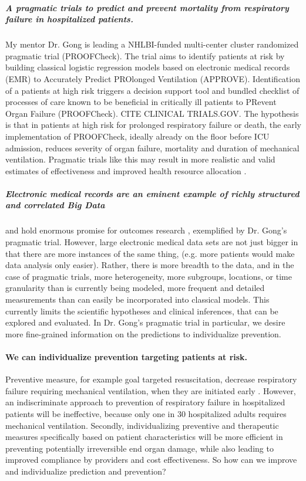 \documentclass[11pt,notitlepage]{article}
\begin{document}
\subparagraph{A pragmatic trials to predict and prevent mortality from respiratory failure in hospitalized patients.} My mentor Dr. Gong is leading a NHLBI-funded multi-center cluster randomized pragmatic trial (PROOFCheck). The trial aims to identify patients at risk by building classical logistic regression models based on electronic medical records (EMR) to Accurately Predict PROlonged Ventilation (APPROVE). Identification of a patients at high risk triggers a decision support tool and bundled checklist of processes of care known to be beneficial in critically ill patients to PRevent Organ Failure (PROOFCheck). CITE CLINICAL TRIALS.GOV. The hypothesis is that in patients at high risk for prolonged respiratory failure or death, the early implementation of PROOFCheck, ideally already on the floor before ICU admission, reduces severity of organ failure, mortality and duration of mechanical ventilation. Pragmatic trials like this may result in more realistic and valid estimates of effectiveness and improved health resource allocation \cite{Selby_22824225,Tosh_21842618}.

\subparagraph{Electronic medical records are an eminent example of richly structured and correlated Big Data} 
and hold enormous promise for outcomes research \cite{Dean_19279318,Amarasingham20940649},  exemplified by Dr. Gong's pragmatic trial. However, large electronic medical data sets are not just bigger in that there are more instances of the same thing, (e.g. more patients would make data analysis only easier).  Rather, there is more breadth to the data, and in the case of pragmatic trials, more heterogeneity, more subgroups, locations, or time granularity than is currently being modeled, more frequent and detailed measurements than can easily be incorporated into classical models.  This currently limits the scientific hypotheses and clinical inferences, that can be explored and evaluated. In Dr. Gong's pragmatic trial in particular, we desire more fine-grained information on the predictions to individualize prevention.  

\paragraph*{We can individualize prevention targeting patients at risk.}
Preventive measure, for example goal targeted resuscitation, decrease respiratory failure requiring mechanical ventilation, when they are initiated early \cite{Rivers_12594312}. However, an indiscriminate approach to prevention of respiratory failure in hospitalized patients will be ineffective, because only one in 30 hospitalized adults requires mechanical ventilation. Secondly, individualizing preventive and therapeutic measures specifically based on patient characteristics will be more efficient in preventing potentially irreversible end organ damage, while also  leading to improved compliance by providers and cost effectiveness. So how can we improve and individualize prediction and prevention? 
\end{document}
